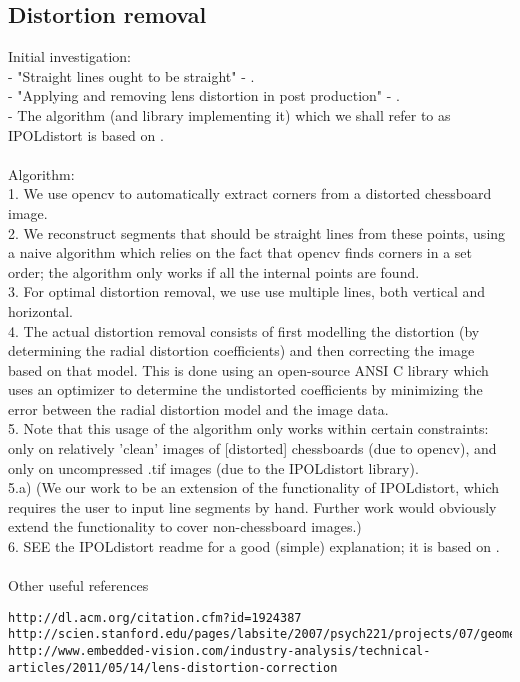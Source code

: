 \subsection{Distortion removal}
Initial investigation:\\
- "Straight lines ought to be straight" - \cite{straightlines} .\\
- "Applying and removing lens distortion in post production" - \cite{postproduction} .\\
- The algorithm (and library implementing it) which we shall refer to as IPOLdistort is based on \cite{algebraic-distortion} .\\\\
Algorithm:\\
1. We use opencv to automatically extract corners from a distorted chessboard image.\\
2. We reconstruct segments that should be straight lines from these points, using a naive algorithm which relies on the fact that opencv finds corners in a set order; the algorithm only works if all the internal points are found.\\
3. For optimal distortion removal, we use use multiple lines, both vertical and horizontal.\\
4. The actual distortion removal consists of first modelling the distortion (by determining the radial distortion coefficients) and then correcting the image based on that model. This is done using an open-source ANSI C library which uses an optimizer to determine the undistorted coefficients by minimizing the error between the radial distortion model and the image data.\\
5. Note that this usage of the algorithm only works within certain constraints: only on relatively 'clean' images of [distorted] chessboards (due to opencv), and only on uncompressed .tif images (due to the IPOLdistort library).\\
5.a) (We our work to be an extension of the functionality of IPOLdistort, which requires the user to input line segments by hand. Further work would obviously extend the functionality to cover non-chessboard images.)\\
6. SEE the IPOLdistort readme for a good (simple) explanation; it is based on \cite{algebraic-distortion}.\\
\\
Other useful references\\
\begin{verbatim}
http://dl.acm.org/citation.cfm?id=1924387
http://scien.stanford.edu/pages/labsite/2007/psych221/projects/07/geometric_distortion/project.htm
http://www.embedded-vision.com/industry-analysis/technical-articles/2011/05/14/lens-distortion-correction
\end{verbatim}
